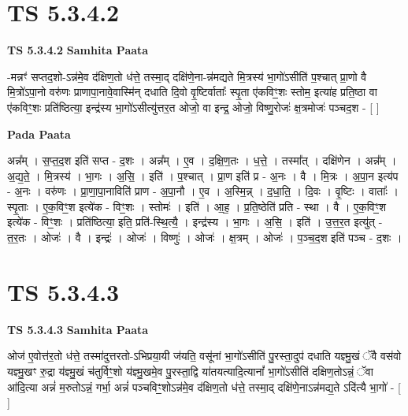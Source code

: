 \documentclass[17pt]{extarticle}
\begin{document}

\section{ TS 5.3.4.2 }

\textbf{TS 5.3.4.2 } \newline
\textbf{Samhita Paata} \newline

-मन्नꣳ॑ सप्तद॒शो-ऽन्न॑मे॒व द॑क्षिण॒तो ध॑त्ते॒ तस्मा॒द् दक्षि॑णे॒ना-न्न॑मद्यते मि॒त्रस्य॑ भा॒गो॑ऽसीति॑ प॒श्चात् प्रा॒णो वै मि॒त्रो॑ऽपा॒नो वरु॑णः प्राणापा॒नावे॒वास्मि॑न् दधाति दि॒वो वृ॒ष्टिर्वाताः᳚ स्पृ॒ता ए॑कविꣳ॒॒शः स्तोम॒ इत्या॑ह प्रति॒ष्ठा वा ए॑कविꣳ॒॒शः प्रति॑ष्ठित्या॒ इन्द्र॑स्य भा॒गो॑ऽसीत्यु॑त्तर॒त ओजो॒ वा इन्द्र॒ ओजो॒ विष्णु॒रोजः॑ क्ष॒त्रमोजः॑ पञ्चद॒श - [  ] \newline

\textbf{Pada Paata} \newline

अन्न᳚म् । स॒प्त॒द॒श इति॑ सप्त - द॒शः । अन्न᳚म् । ए॒व । द॒क्षि॒ण॒तः । ध॒त्ते॒ । तस्मा᳚त् । दक्षि॑णेन । अन्न᳚म् । अ॒द्य॒ते॒ । मि॒त्रस्य॑ । भा॒गः । अ॒सि॒ । इति॑ । प॒श्चात् । प्रा॒ण इति॑ प्र - अ॒नः । वै । मि॒त्रः । अ॒पा॒न इत्य॑प - अ॒नः । वरु॑णः । प्रा॒णा॒पा॒नाविति॑ प्राण - अ॒पा॒नौ । ए॒व । अ॒स्मि॒न्न् । द॒धा॒ति॒ । दि॒वः । वृ॒ष्टिः । वाताः᳚ । स्पृ॒ताः । ए॒क॒विꣳ॒॒श इत्ये॑क - विꣳ॒॒शः । स्तोमः॑ । इति॑ । आ॒ह॒ । प्र॒ति॒ष्ठेति॑ प्रति - स्था । वै । ए॒क॒विꣳ॒॒श इत्ये॑क - विꣳ॒॒शः । प्रति॑ष्ठित्या॒ इति॒ प्रति॑-स्थि॒त्यै॒ । इन्द्र॑स्य । भा॒गः । अ॒सि॒ । इति॑ । उ॒त्त॒र॒त इत्यु॑त् - त॒र॒तः । ओजः॑ । वै । इन्द्रः॑ । ओजः॑ । विष्णुः॑ । ओजः॑ । क्ष॒त्रम् । ओजः॑ । प॒ञ्च॒द॒श इति॑ पञ्च - द॒शः ।  \newline





\section{ TS 5.3.4.3 }

\textbf{TS 5.3.4.3 } \newline
\textbf{Samhita Paata} \newline

ओज॑ ए॒वोत्त॑र॒तो ध॑त्ते॒ तस्मा॑दुत्तरतो-ऽभिप्रया॒यी ज॑यति॒ वसू॑नां भा॒गो॑ऽसीति॑ पु॒रस्ता॒दुप॑ दधाति यज्ञ्मु॒खं ॅवै वस॑वो यज्ञ्मु॒खꣳ रु॒द्रा य॑ज्ञ्मु॒खं च॑तुर्विꣳ॒॒शो य॑ज्ञ्मु॒खमे॒व पु॒रस्ता॒द्वि या॑तयत्यादि॒त्यानां᳚ भा॒गो॑ऽसीति॑ दक्षिण॒तोऽन्नं॒ ॅवा आ॑दि॒त्या अन्नं॑ म॒रुतोऽन्नं॒ गर्भा॒ अन्नं॑ पञ्चविꣳ॒॒शोऽन्न॑मे॒व द॑क्षिण॒तो ध॑त्ते॒ तस्मा॒द् दक्षि॑णे॒नाऽन्न॑मद्य॒ते ऽदि॑त्यै भा॒गो॑ - [  ] \newline
\end{document}

